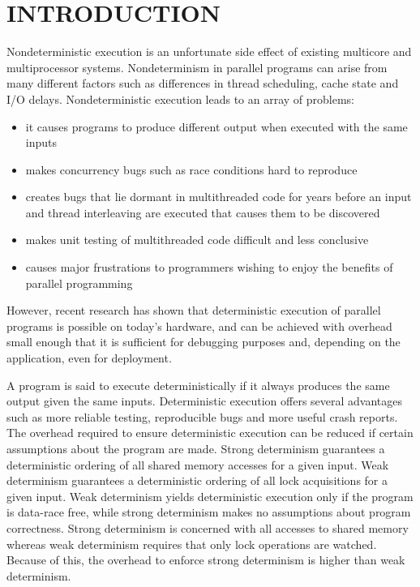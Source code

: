 \chapter{INTRODUCTION}

Nondeterministic execution is an unfortunate side effect of existing
multicore and multiprocessor systems.  Nondeterminism in parallel
programs can arise from many different factors such as differences in
thread scheduling, cache state and I/O delays.  Nondeterministic
execution leads to an array of problems:

\begin{itemize}
\item it causes programs to produce different output when executed
  with the same inputs

\item makes concurrency bugs such as race conditions hard to reproduce

\item creates bugs that lie dormant in multithreaded code for years
  before an input and thread interleaving are executed that causes
  them to be discovered

\item makes unit testing of multithreaded code difficult and less
  conclusive

\item causes major frustrations to programmers wishing to enjoy the
  benefits of parallel programming
\end{itemize}

However, recent research has shown that deterministic execution of
parallel programs is possible on today's hardware, and can be achieved
with overhead small enough that it is sufficient for debugging
purposes and, depending on the application, even for deployment.

A program is said to execute deterministically if it always produces
the same output given the same inputs.  Deterministic execution offers
several advantages such as more reliable testing, reproducible bugs
and more useful crash reports.  The overhead required to ensure
deterministic execution can be reduced if certain assumptions about
the program are made.  Strong determinism guarantees a deterministic
ordering of all shared memory accesses for a given input.  Weak
determinism guarantees a deterministic ordering of all lock
acquisitions for a given input.  Weak determinism yields deterministic
execution only if the program is data-race free, while strong
determinism makes no assumptions about program correctness.  Strong
determinism is concerned with all accesses to shared memory whereas
weak determinism requires that only lock operations are watched.
Because of this, the overhead to enforce strong determinism is higher
than weak determinism.

